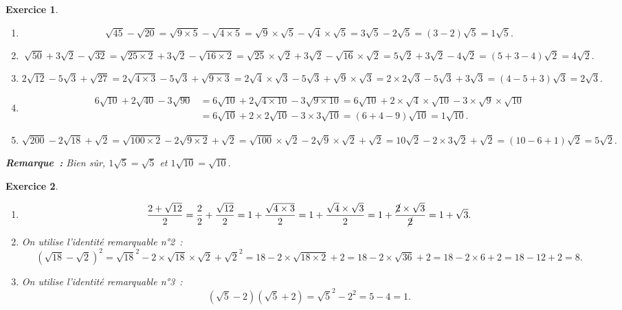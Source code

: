 \documentclass[10pt]{article}
\newtheorem{exo}{Exercice}
\begin{document}
\begin{exo}


\begin{enumerate}
\item \[\sqrt{45}-\sqrt{20}=\sqrt{9\times 5}-\sqrt{4\times 5}=\sqrt{9}\times\sqrt{5}-\sqrt{4}\times\sqrt{5}=3\sqrt{5}-2\sqrt{5}=(3-2)\sqrt{5}=1\sqrt{5}.\]

\item \[\sqrt{50}+3\sqrt{2}-\sqrt{32}=\sqrt{25\times 2}+3\sqrt{2}-\sqrt{16\times 2}=\sqrt{25}\times \sqrt{2}+3\sqrt{2}-\sqrt{16}\times \sqrt{2}=5\sqrt{2}+3\sqrt{2}-4\sqrt{2}=(5+3-4)\sqrt{2}=4\sqrt{2}.\]


\item \[2\sqrt{12}-5\sqrt{3}+\sqrt{27}=2\sqrt{4\times 3}-5\sqrt{3}+\sqrt{9\times 3}=2\sqrt{4}\times\sqrt{3}-5\sqrt{3}+\sqrt{9}\times\sqrt{3}=2\times 2\sqrt{3}-5\sqrt{3}+3\sqrt{3}=(4-5+3)\sqrt{3}=2\sqrt{3}.\]

\item \begin{align*}6\sqrt{10}+2\sqrt{40}-3\sqrt{90}&=6\sqrt{10}+2\sqrt{4\times 10}-3\sqrt{9\times 10}=6\sqrt{10}+2\times\sqrt{4}\times\sqrt{10}-3\times\sqrt{9}\times\sqrt{10}\\&=6\sqrt{10}+2\times 2\sqrt{10}-3\times 3\sqrt{10}=(6+4-9)\sqrt{10}=1\sqrt{10}.\end{align*}
\item \[\sqrt{200}-2\sqrt{18}+\sqrt{2}=\sqrt{100\times 2}-2\sqrt{9\times 2}+\sqrt{2}
=\sqrt{100}\times \sqrt{2}-2\sqrt{9}\times \sqrt{2}+ \sqrt{2}=10 \sqrt{2}-2\times 3 \sqrt{2}+ \sqrt{2}=\left(10-6+1\right) \sqrt{2}=5 \sqrt{2}.\]
\end{enumerate}

\medskip

\textbf{Remarque~:} Bien sûr, $1\sqrt{5}=\sqrt{5}$ et $1\sqrt{10}=\sqrt{10}.$
\end{exo}

\begin{exo}

\begin{enumerate}
\item \[\frac{2+\sqrt{12}}{2}=\frac{2}{2}+\frac{\sqrt{12}}{2}=1+\frac{\sqrt{4\times 3}}{2}=1+\frac{\sqrt{4}\times \sqrt{3}}{2}=1+\frac{\cancel{2}\times \sqrt{3}}{\cancel{2}}=1+\sqrt{3}.\]
\item On utilise l'identité remarquable n°2~:
\[\left(\sqrt{18}-\sqrt{2}\right)^2=\sqrt{18}^2-2\times \sqrt{18}\times \sqrt{2}+\sqrt{2}^2=18-2\times\sqrt{18\times 2}+2=18-2\times\sqrt{36}+2=18-2\times 6+2=18-12+2=8.\]
\item On utilise l'identité remarquable n°3~:\[\left(\sqrt{5}-2\right)\left(\sqrt{5}+2\right)=\sqrt{5}^2-2^2=5-4=1.\]
\end{enumerate}
\end{exo}
\end{document}
